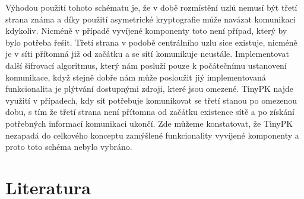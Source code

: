 \documentclass[11pt,final,twoside]{fithesis2}
\begin{document}
Výhodou použití tohoto schématu je, že v době rozmístění uzlů nemusí být třetí strana známa a díky použití asymetrické kryptografie může navázat komunikaci kdykoliv.
Nicméně v případě vyvíjené komponenty toto není případ, který by bylo potřeba řešit. Třetí strana v podobě centrálního uzlu sice existuje, nicméně je v síti přítomná již 
od začátku a se sítí komunikuje neustále. Implementovat další šifrovací algoritmus, který nám posluží pouze k počátečnímu ustanovení komunikace, když stejně dobře 
nám může posloužit jiý implementovaná funkcionalita je plýtvání dostupnými zdroji, které jsou omezené. TinyPK najde využití v případech, kdy síť potřebuje komunikovat
se třetí stanou po omezenou dobu, s tím že třetí strana není přítomna od začátku existence sítě a po získání potřebných informací komunikaci ukončí. Zde můžeme konstatovat, že 
TinyPK nezapadá do celkového konceptu zamýšlené funkcionality vyvíjené komponenty a proto toto schéma nebylo vybráno.





\begingroup
\def\tmpchapter{0}
\renewcommand{\chaptername}{}
\renewcommand{\thechapter}{}
\chapter{Literatura}
\renewcommand{\chapter}[2]{}%




\endgroup

\appendix

\end{document}
